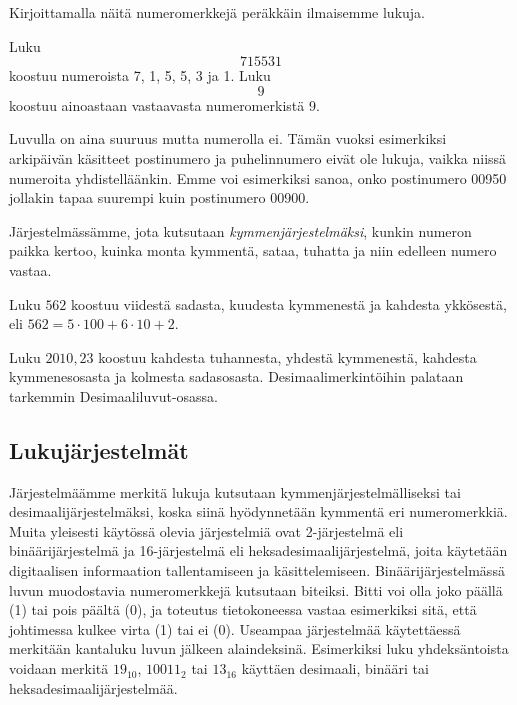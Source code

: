 Kirjoittamalla näitä numeromerkkejä peräkkäin ilmaisemme lukuja.


\begin{esimerkki}
Luku \[715531\] koostuu numeroista 7, 1, 5, 5, 3 ja 1.
Luku \[9\] koostuu ainoastaan vastaavasta numeromerkistä 9.
\end{esimerkki}

Luvulla on aina suuruus mutta numerolla ei. Tämän vuoksi esimerkiksi arkipäivän käsitteet postinumero ja puhelinnumero eivät ole lukuja, vaikka niissä numeroita yhdistelläänkin. Emme voi esimerkiksi sanoa, onko postinumero 00950 jollakin tapaa suurempi kuin postinumero 00900.

Järjestelmässämme, jota kutsutaan \emph{kymmenjärjestelmäksi}, kunkin numeron paikka kertoo, kuinka monta kymmentä, sataa, tuhatta ja niin edelleen numero vastaa.

\begin{esimerkki}
Luku $562$ koostuu viidestä sadasta, kuudesta kymmenestä ja kahdesta ykkösestä, eli $562= 5 \cdot 100 + 6 \cdot 10 + 2$.

Luku $2 010,23$ koostuu kahdesta tuhannesta, yhdestä kymmenestä, kahdesta kymmenesosasta ja kolmesta sadasosasta. Desimaalimerkintöihin palataan tarkemmin Desimaaliluvut-osassa.
\end{esimerkki}


\subsection*{Lukujärjestelmät}

Järjestelmäämme merkitä lukuja kutsutaan kymmenjärjestelmälliseksi tai desimaalijärjestelmäksi, koska siinä hyödynnetään kymmentä eri numeromerkkiä. Muita yleisesti käytössä olevia järjestelmiä ovat 2-järjestelmä eli binäärijärjestelmä ja 16-järjestelmä eli heksadesimaalijärjestelmä, joita käytetään digitaalisen informaation tallentamiseen ja käsittelemiseen. Binäärijärjestelmässä luvun muodostavia numeromerkkejä kutsutaan biteiksi. Bitti voi olla joko päällä (1) tai pois päältä (0), ja toteutus tietokoneessa vastaa esimerkiksi sitä, että johtimessa kulkee virta (1) tai ei (0). Useampaa järjestelmää käytettäessä merkitään kantaluku luvun jälkeen alaindeksinä. Esimerkiksi luku yhdeksäntoista voidaan merkitä $19_{10}$, $10011_{2}$ tai $13_{16}$ käyttäen desimaali, binääri tai heksadesimaalijärjestelmää.


